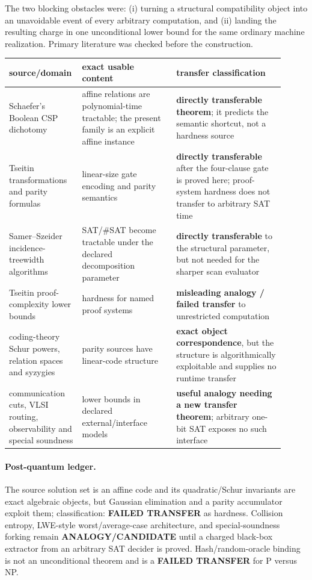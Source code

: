 \documentclass[11pt]{article}
\begin{document}
The two blocking obstacles were: (i) turning a structural compatibility object
into an unavoidable event of every arbitrary computation, and (ii) landing
the resulting charge in one unconditional lower bound for the same ordinary
machine realization.  Primary literature was checked before the construction.

\begin{longtable}{p{0.20\linewidth}p{0.33\linewidth}p{0.38\linewidth}}
\toprule
source/domain & exact usable content & transfer classification\\
\midrule
Schaefer's Boolean CSP dichotomy & affine relations are polynomial-time
tractable; the present family is an explicit affine instance &
\textbf{directly transferable theorem}; it predicts the semantic shortcut,
not a hardness source\\
Tseitin transformations and parity formulas & linear-size gate encoding and
parity semantics & \textbf{directly transferable} after the four-clause gate
is proved here; proof-system hardness does not transfer to arbitrary SAT time\\
Samer--Szeider incidence-treewidth algorithms & SAT/\#SAT become tractable
under the declared decomposition parameter & \textbf{directly transferable}
to the structural parameter, but not needed for the sharper scan evaluator\\
Tseitin proof-complexity lower bounds & hardness for named proof systems &
\textbf{misleading analogy / failed transfer} to unrestricted computation\\
coding-theory Schur powers, relation spaces and syzygies & parity sources have
linear-code structure & \textbf{exact object correspondence}, but the
structure is algorithmically exploitable and supplies no runtime transfer\\
communication cuts, VLSI routing, observability and special soundness & lower
bounds in declared external/interface models & \textbf{useful analogy needing
a new transfer theorem}; arbitrary one-bit SAT exposes no such interface\\
\bottomrule
\end{longtable}

\paragraph{Post-quantum ledger.}
The source solution set is an affine code and its quadratic/Schur invariants
are exact algebraic objects, but Gaussian elimination and a parity accumulator
exploit them; classification: \textbf{FAILED TRANSFER} as hardness.  Collision
entropy, LWE-style worst/average-case architecture, and special-soundness
forking remain \textbf{ANALOGY/CANDIDATE} until a charged black-box extractor
from an arbitrary SAT decider is proved.  Hash/random-oracle binding is not an
unconditional theorem and is a \textbf{FAILED TRANSFER} for P versus NP.
\end{document}
